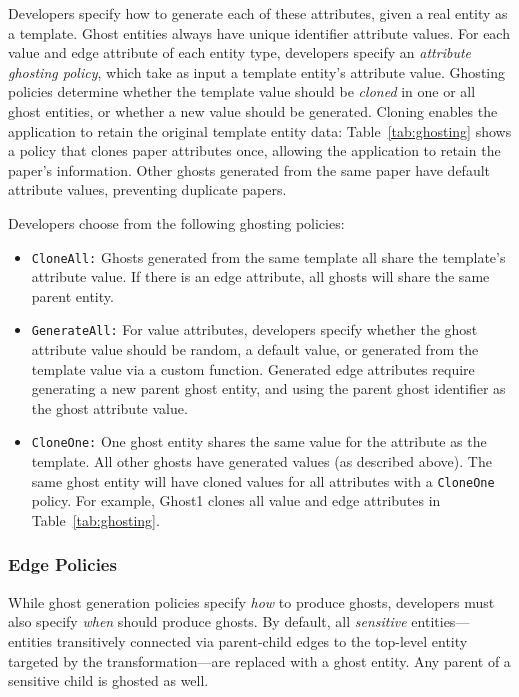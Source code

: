 Developers specify how to generate each of these attributes, given a real entity as a template.
Ghost entities always have unique identifier attribute values.
For each value and edge attribute of each entity type, developers specify an \emph{attribute ghosting policy},
which take as input a template entity's attribute value. Ghosting policies determine whether the
template value should be \emph{cloned} in one or all ghost entities, or whether
a new value should be generated. Cloning enables the application to retain
the original template entity data: Table~\ref{tab:ghosting} shows a policy that clones
paper attributes once, allowing the application to retain the paper's information. Other ghosts
generated from the same paper have default attribute values, preventing duplicate papers.

Developers choose from the following ghosting policies:
\begin{itemize}
    \item \texttt{CloneAll:} Ghosts generated from the same template all share the template's 
        attribute value. If there is an edge attribute, all ghosts will share the
        same parent entity.

    \item \texttt{GenerateAll:} 
        For value attributes, developers specify whether the ghost attribute value should be
        random, a default value, or generated from the template value via a custom function.
        Generated edge attributes require generating a new parent ghost entity, and using the parent ghost
        identifier as the ghost attribute value.

    \item \texttt{CloneOne:} One ghost entity shares the same value for the attribute as the
        template. All other ghosts have generated values (as described above).
        The same ghost entity will have cloned values for all attributes with a
        \texttt{CloneOne} policy. For example, Ghost1 clones all value and edge attributes in Table~\ref{tab:ghosting}.
\end{itemize}

\subsubsection{Edge Policies}
\label{design:edgepol}
While ghost generation policies specify \emph{how} to produce ghosts, developers must also specify
\emph{when} \sys should produce ghosts. 
By default, all \emph{sensitive} entities---entities transitively connected via
parent-child edges to the top-level entity targeted by the transformation---are replaced with a ghost entity. 
Any parent of a sensitive child is ghosted as well. 

